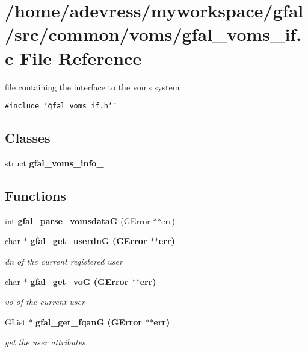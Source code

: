 \section{/home/adevress/myworkspace/gfal/src/common/voms/gfal\_\-voms\_\-if.c File Reference}
\label{gfal__voms__if_8c}
file containing the interface to the voms system 

{\tt \#include \char`\"{}gfal\_\-voms\_\-if.h\char`\"{}}\par
\subsection*{Classes}
\begin{CompactItemize}
\item 
struct \textbf{gfal\_\-voms\_\-info\_\-}
\end{CompactItemize}
\subsection*{Functions}
\begin{CompactItemize}
\item 
int \textbf{gfal\_\-parse\_\-vomsdata\-G} (GError $\ast$$\ast$err)\label{gfal__voms__if_8c_fad846d1ae353ebf568469b4d15cab50}

\item 
char $\ast$ \bf{gfal\_\-get\_\-userdn\-G} (GError $\ast$$\ast$err)
\begin{CompactList}\small\item\em dn of the current registered user \item\end{CompactList}\item 
char $\ast$ \bf{gfal\_\-get\_\-vo\-G} (GError $\ast$$\ast$err)
\begin{CompactList}\small\item\em vo of the current user \item\end{CompactList}\item 
GList $\ast$ \bf{gfal\_\-get\_\-fqan\-G} (GError $\ast$$\ast$err)
\begin{CompactList}\small\item\em get the user attributes \item\end{CompactList}\end{CompactItemize}


